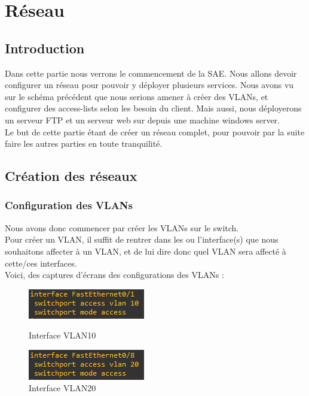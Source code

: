\documentclass[12pt, a4paper]{article}
\begin{document}
\newpage
\section{Réseau}
	\subsection{Introduction}
	Dans cette partie nous verrons le commencement de la SAE. Nous allons
	devoir configurer un réseau pour pouvoir y déployer plusieurs services. 
	Nous avons vu sur le schéma précédent que nous serions amener à créer 
	des VLANs, et configurer des access-lists selon les besoin 
	du client. Mais aussi, nous déployerons un serveur FTP et un serveur web
	sur depuis une machine windows server.\\
	Le but de cette partie étant de créer un réseau complet, pour pouvoir
	par la suite faire les autres parties en toute tranquilité.

	\subsection{Création des réseaux}
		\subsubsection{Configuration des VLANs}
		Nous avons donc commencer par créer les VLANs sur le switch.\\
		Pour créer un VLAN, il suffit de rentrer dans les ou l'interface(s) 
		que nous souhaitons affecter à un VLAN, et de lui dire donc quel VLAN
		sera affecté à cette/ces interfaces.\\
		Voici, des captures d'écrans des configurations des VLANs :\\[0.5cm]
		\begin{figure}[h]
			\begin{minipage}[c]{.46\linewidth}
				\centering
				\includegraphics{screens/SW/Interface-VLAN10.png}
				\caption{Interface VLAN10}
			\end{minipage}
			\hfill%
			\begin{minipage}[c]{.46\linewidth}
				\centering
				\includegraphics{screens/SW/Interface-VLAN20.png}
				\caption{Interface VLAN20}
			\end{minipage}
		\end{figure}
\end{document}
